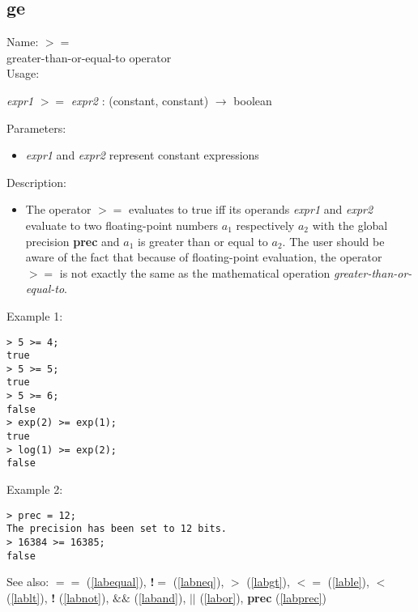 \subsection{ge}
\label{labge}
\noindent Name: \textbf{$>=$}\\
greater-than-or-equal-to operator\\

\noindent Usage: 
\begin{center}
\emph{expr1} \textbf{$>=$} \emph{expr2} : (\textsf{constant}, \textsf{constant}) $\rightarrow$ \textsf{boolean}\\
\end{center}
Parameters: 
\begin{itemize}
\item \emph{expr1} and \emph{expr2} represent constant expressions
\end{itemize}
\noindent Description: \begin{itemize}

\item The operator \textbf{$>=$} evaluates to true iff its operands \emph{expr1} and
   \emph{expr2} evaluate to two floating-point numbers $a_1$
   respectively $a_2$ with the global precision \textbf{prec} and
   $a_1$ is greater than or equal to $a_2$. The user should
   be aware of the fact that because of floating-point evaluation, the
   operator \textbf{$>=$} is not exactly the same as the mathematical
   operation \emph{greater-than-or-equal-to}.
\end{itemize}
\noindent Example 1: 
\begin{center}\begin{minipage}{15cm}\begin{Verbatim}[frame=single]
> 5 >= 4;
true
> 5 >= 5;
true
> 5 >= 6;
false
> exp(2) >= exp(1);
true
> log(1) >= exp(2);
false
\end{Verbatim}
\end{minipage}\end{center}
\noindent Example 2: 
\begin{center}\begin{minipage}{15cm}\begin{Verbatim}[frame=single]
> prec = 12;
The precision has been set to 12 bits.
> 16384 >= 16385;
false
\end{Verbatim}
\end{minipage}\end{center}
See also: \textbf{$==$} (\ref{labequal}), \textbf{!$=$} (\ref{labneq}), \textbf{$>$} (\ref{labgt}), \textbf{$<=$} (\ref{lable}), \textbf{$<$} (\ref{lablt}), \textbf{!} (\ref{labnot}), \textbf{$\&\&$} (\ref{laband}), \textbf{$||$} (\ref{labor}), \textbf{prec} (\ref{labprec})
